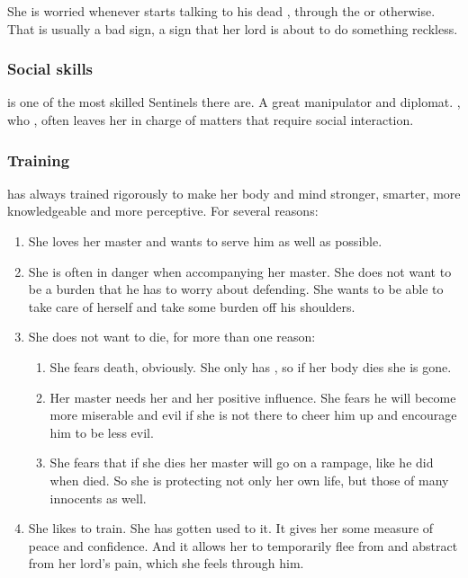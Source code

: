 She is worried whenever \Ishnaruchaefir{} starts talking to his dead \Triestessakhin, through the  or otherwise. That is usually a bad sign, a sign that her lord is about to do something reckless. 





\subsubsection{Social skills}
\Criseis{} is one of the most skilled Sentinels there are. 
A great manipulator and diplomat. 
\Ishnaruchaefir, who , often leaves her in charge of matters that require social interaction. 





\subsubsection{Training}
\Criseis{} has always trained rigorously to make her body and mind stronger, smarter, more knowledgeable and more perceptive. 
For several reasons:
\begin{enumerate}
  \item She loves her master and wants to serve him as well as possible.
  \item She is often in danger when accompanying her master. 
    She does not want to be a burden that he has to worry about defending. 
    She wants to be able to take care of herself and take some burden off his shoulders. 
  \item She does not want to die, for more than one reason:
    \begin{enumerate}
      \item 
        She fears death, obviously. 
        She only has , so if her body dies she is gone. 
      \item 
        Her master needs her and her positive influence. 
        She fears he will become more miserable and evil if she is not there to cheer him up and encourage him to be less evil. 
      \item 
        She fears that if she dies her master will go on a rampage, like he did when  died.
        So she is protecting not only her own life, but those of many innocents as well. 
    \end{enumerate}
  \item 
    She likes to train. 
    She has gotten used to it. 
    It gives her some measure of peace and confidence. 
    And it allows her to temporarily flee from and abstract from her lord's pain, which she feels through him. 
\end{enumerate}





